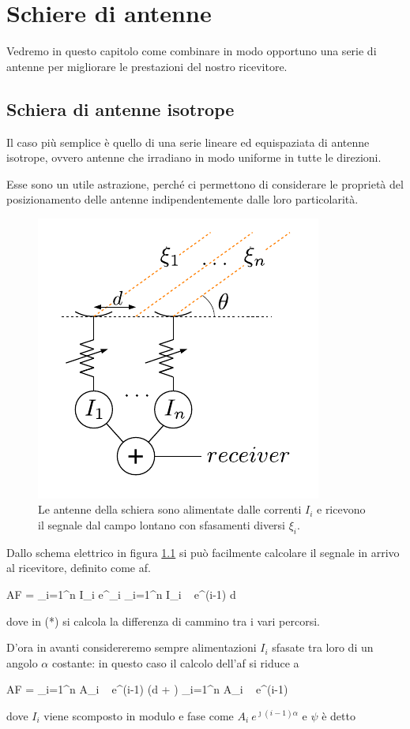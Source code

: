 \chapter{Schiere di antenne}

	Vedremo in questo capitolo come combinare in modo opportuno una serie di antenne per migliorare le prestazioni del nostro ricevitore.

\section{Schiera di antenne isotrope}
	Il caso più semplice è quello di una serie lineare ed equispaziata di antenne isotrope, ovvero antenne che irradiano in modo uniforme in tutte le direzioni.

	Esse sono un utile astrazione, perché ci permettono di considerare le proprietà del posizionamento delle antenne indipendentemente dalle loro particolarità.

	\begin{figure}[ht]
		\centering
		\includegraphics{img/schiera_antenne.pdf}
		\caption{Le antenne della schiera sono alimentate dalle correnti $I_i$ e ricevono il segnale dal campo lontano con sfasamenti diversi $\xi_i$.}
		\label{fig:schiera}
	\end{figure}

	Dallo schema elettrico in figura \ref{fig:schiera} si può facilmente calcolare il segnale in arrivo al ricevitore, definito come \gls{af}.

	\begin{esp} \label{eq:array_factor}
		AF = \sum_{i=1}^n I_i e^{\jmath \xi_i}
			\stackrel{(*)}{=} \sum_{i=1}^n I_i ~ e^{\jmath (i-1) \beta d \cos \theta}
	\end{esp}
	dove in (*) si calcola la differenza di cammino tra i vari percorsi.

	D'ora in avanti considereremo sempre alimentazioni $I_i$ sfasate tra loro di un angolo $\alpha$ costante: in questo caso il calcolo dell'\gls{af} si riduce a

	\begin{esp}
		AF = \sum_{i=1}^n A_i ~ e^{\jmath (i-1) (\beta d \cos \theta + \alpha)}
			 \sum_{i=1}^n A_i ~ e^{\jmath (i-1) \psi}
	\end{esp}
	dove $I_i$ viene scomposto in modulo e fase come $A_i ~ e^{\jmath (i-1) \alpha}$ e $\psi$ è detto
